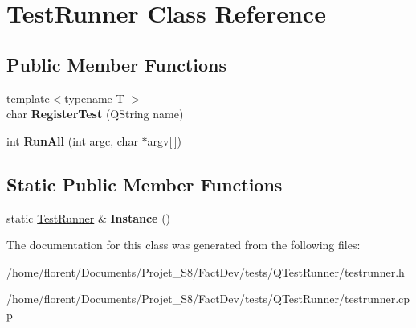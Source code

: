 \hypertarget{classTestRunner}{\section{Test\-Runner Class Reference}
\label{classTestRunner}
}
\subsection*{Public Member Functions}
\begin{DoxyCompactItemize}
\item 
\hypertarget{classTestRunner_affb5703febccf285914b08ce39e7396f}{{\footnotesize template$<$typename T $>$ }\\char {\bfseries Register\-Test} (Q\-String name)}\label{classTestRunner_affb5703febccf285914b08ce39e7396f}

\item 
\hypertarget{classTestRunner_a0a247b43d9154ab88b489051d22221e3}{int {\bfseries Run\-All} (int argc, char $\ast$argv\mbox{[}$\,$\mbox{]})}\label{classTestRunner_a0a247b43d9154ab88b489051d22221e3}

\end{DoxyCompactItemize}
\subsection*{Static Public Member Functions}
\begin{DoxyCompactItemize}
\item 
\hypertarget{classTestRunner_a4707c4680c85ce622fc375efcf39fc25}{static \hyperlink{classTestRunner}{Test\-Runner} \& {\bfseries Instance} ()}\label{classTestRunner_a4707c4680c85ce622fc375efcf39fc25}

\end{DoxyCompactItemize}


The documentation for this class was generated from the following files\-:\begin{DoxyCompactItemize}
\item 
/home/florent/\-Documents/\-Projet\-\_\-\-S8/\-Fact\-Dev/tests/\-Q\-Test\-Runner/testrunner.\-h\item 
/home/florent/\-Documents/\-Projet\-\_\-\-S8/\-Fact\-Dev/tests/\-Q\-Test\-Runner/testrunner.\-cpp\end{DoxyCompactItemize}
